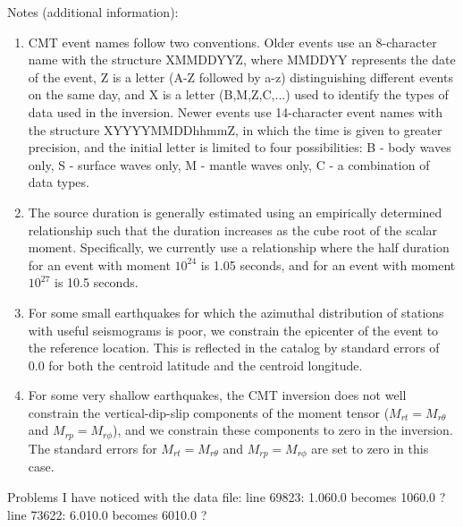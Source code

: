         
Notes (additional information):
\begin{enumerate}
\item CMT event names follow two conventions. Older events use an 8-character 
name with the structure XMMDDYYZ, where MMDDYY represents the date of
the event, Z is a letter (A-Z followed by a-z) distinguishing different 
events on the same day, and X is a letter (B,M,Z,C,...) used to identify 
the types of data used in the inversion. Newer events use 14-character event 
names with the structure XYYYYMMDDhhmmZ, in which the time is given to greater
precision, and the initial letter is limited to four possibilities: B - body 
waves only, S - surface waves only, M - mantle waves only, C - a combination 
of data types.

\item The source duration is generally estimated using an empirically determined
relationship such that the duration increases as the cube root of the scalar
moment. Specifically, we currently use a relationship where the half duration
for an event with moment $10^{24}$ is 1.05 seconds, and for an event with moment
$10^{27}$ is 10.5 seconds.

\item For some small earthquakes for which the azimuthal distribution of stations 
with useful seismograms is poor, we constrain the epicenter of the event to
the reference location. This is reflected in the catalog by standard 
errors of 0.0 for both the centroid latitude and the centroid longitude.

\item For some very shallow earthquakes, the CMT inversion does not well 
constrain the vertical-dip-slip components of the moment tensor ($M_{rt}=M_{r\theta}$ and $M_{rp}=M_{r\phi}$),
and we constrain these components to zero in the inversion. The standard
errors for $M_{rt}=M_{r\theta}$ and $M_{rp}=M_{r\phi}$ are set to zero in this case.
\end{enumerate}

\vspace{1cm}

Problems I have noticed with the data file:
line 69823: 1.060.0 becomes 1060.0 ?
line 73622: 6.010.0 becomes 6010.0 ? 


